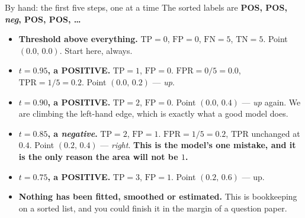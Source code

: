 \documentclass[aspectratio=169]{beamer}
\newcommand{\TP}{\mathrm{TP}}
\newcommand{\FP}{\mathrm{FP}}
\newcommand{\TN}{\mathrm{TN}}
\newcommand{\FN}{\mathrm{FN}}
\newcommand{\TPR}{\mathrm{TPR}}
\newcommand{\FPR}{\mathrm{FPR}}
\begin{document}
\begin{frame}[shrink=6]{By hand: the first five steps, one at a time}
The sorted labels are \textbf{POS, POS, \emph{neg}, POS, POS, \dots}
  \begin{itemize}\small
    \item<1-> \textbf{Threshold above everything.} $\TP = 0$, $\FP = 0$,
      $\FN = 5$, $\TN = 5$. Point $(0.0,\, 0.0)$. Start here, always.
    \item<2-> \textbf{$t = 0.95$, a POSITIVE.} $\TP = 1$, $\FP = 0$.
      $\FPR = 0/5 = 0.0$, $\TPR = 1/5 = 0.2$. Point $(0.0,\, 0.2)$ ---
      \emph{up}.
    \item<3-> \textbf{$t = 0.90$, a POSITIVE.} $\TP = 2$, $\FP = 0$.
      Point $(0.0,\, 0.4)$ --- \emph{up} again. We are climbing the left-hand
      edge, which is exactly what a good model does.
    \item<4-> \textbf{$t = 0.85$, a \emph{negative}.} $\TP = 2$, $\FP = 1$.
      $\FPR = 1/5 = 0.2$, $\TPR$ unchanged at $0.4$. Point $(0.2,\, 0.4)$ ---
      \emph{right}. \textbf{This is the model's one mistake, and it is the
      only reason the area will not be $1$.}
    \item<5-> \textbf{$t = 0.75$, a POSITIVE.} $\TP = 3$, $\FP = 1$.
      Point $(0.2,\, 0.6)$ --- up.
    \item<6-> \textbf{Nothing has been fitted, smoothed or estimated.} This is
      bookkeeping on a sorted list, and you could finish it in the margin of a
      question paper.
  \end{itemize}
\end{frame}
\end{document}
